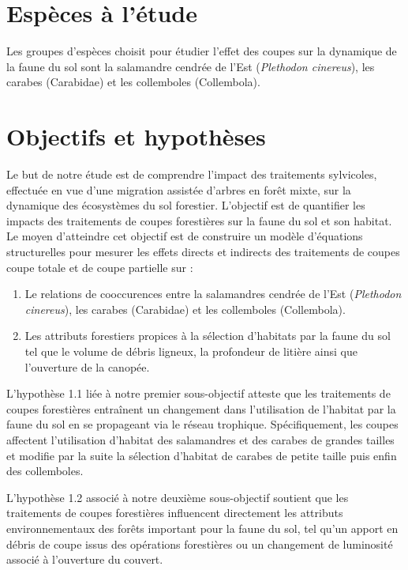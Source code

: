 \section*{Espèces à l'étude}
\label{sec:species}

Les groupes d'espèces choisit pour étudier l'effet des coupes sur la dynamique de la faune du sol sont la salamandre cendrée de l'Est (\textit{Plethodon cinereus}), 
les carabes (Carabidae) et les collemboles (Collembola).


\section*{Objectifs et hypothèses}
\label{sec:objectifs}

Le but de notre étude est de comprendre l'impact des traitements sylvicoles, effectuée en vue d'une migration assistée d'arbres en forêt mixte, sur la dynamique des écosystèmes du sol forestier.
L'objectif est de quantifier les impacts des traitements de coupes forestières sur la faune du sol et son habitat. 
Le moyen d'atteindre cet objectif est de construire un modèle d'équations structurelles pour mesurer les effets directs et indirects des traitements de coupes coupe totale et de coupe partielle sur : 

\begin{enumerate}
    \item Le relations de cooccurences entre la salamandres cendrée de l'Est (\textit{Plethodon cinereus}), les carabes (Carabidae) et les collemboles (Collembola).
    \item Les attributs forestiers propices à la sélection d'habitats par la faune du sol tel que le volume de débris ligneux, la profondeur de litière ainsi que l'ouverture de la canopée. 
\end{enumerate}


L'hypothèse 1.1 liée à notre premier sous-objectif atteste que les traitements de coupes forestières entraînent un changement dans l'utilisation de l'habitat par la faune du sol en se propageant via le réseau trophique. 
Spécifiquement, les coupes affectent l'utilisation d'habitat des salamandres et des carabes de grandes tailles et modifie par la suite la sélection d'habitat de carabes de petite taille puis enfin des collemboles. 

L'hypothèse 1.2 associé à notre deuxième sous-objectif soutient que les traitements de coupes forestières influencent directement les attributs environnementaux des forêts important pour la faune du sol, 
tel qu'un apport en débris de coupe issus des opérations forestières ou un changement de luminosité associé à l'ouverture du couvert.


\cleardoublepage



